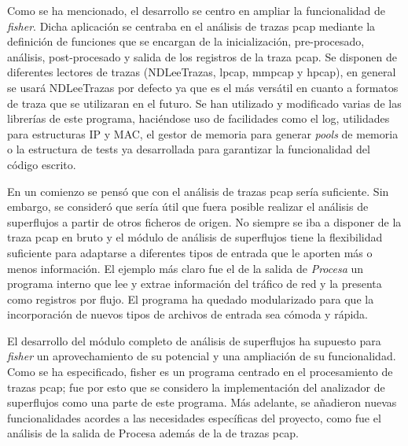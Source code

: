 \documentclass[twoside, 12pt]{epstfg}
\begin{document}
Como se ha mencionado, el desarrollo se centro en ampliar la funcionalidad de \textit{fisher}. Dicha aplicación se centraba en el análisis de trazas pcap mediante la definición de funciones que se encargan de la inicialización, pre-procesado, análisis, post-procesado y salida de los registros de la traza pcap. Se disponen de diferentes lectores de trazas (NDLeeTrazas, lpcap, mmpcap y hpcap), en general se usará NDLeeTrazas por defecto ya que es el más versátil en cuanto a formatos de traza que se utilizaran en el futuro. 
Se han utilizado y modificado varias de las librerías de este programa, haciéndose uso de facilidades como el log, utilidades para estructuras IP y MAC, el gestor de memoria para generar \textit{pools} de memoria o la estructura de tests ya desarrollada para garantizar la funcionalidad del código escrito.

En un comienzo se pensó que con el análisis de trazas pcap sería suficiente. Sin embargo, se consideró que sería útil que fuera posible realizar el análisis de superflujos a partir de otros ficheros de origen. No siempre se iba a disponer de la traza pcap en bruto y el módulo de análisis de superflujos tiene la flexibilidad suficiente para adaptarse a diferentes tipos de entrada que le aporten más o menos información. El ejemplo más claro fue el de la salida de \textit{Procesa} un programa interno que lee y extrae información del tráfico de red y la presenta como registros por flujo. El programa ha quedado modularizado para que la incorporación de nuevos tipos de archivos de entrada sea cómoda y rápida.

El desarrollo del módulo completo de análisis de superflujos ha supuesto para \textit{fisher} un aprovechamiento de su potencial y una ampliación de su funcionalidad. Como se ha especificado, fisher es un programa centrado en el procesamiento de trazas pcap; fue por esto que se considero la implementación del analizador de superflujos como una parte de este programa. Más adelante, se añadieron nuevas funcionalidades acordes a las necesidades específicas del proyecto, como fue el análisis de la salida de Procesa además de la de trazas pcap.
\end{document}
